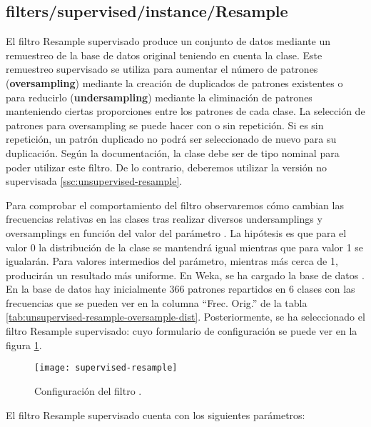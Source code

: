 \subsection{filters/supervised/instance/Resample}
\label{ssc:supervised-resample}
El filtro Resample supervisado produce un conjunto de datos mediante un remuestreo de la base de datos original teniendo en cuenta la clase. Este remuestreo supervisado se utiliza para aumentar el número de patrones (\textbf{oversampling}) mediante la creación de duplicados de patrones existentes o para reducirlo (\textbf{undersampling}) mediante la eliminación de patrones manteniendo ciertas proporciones entre los patrones de cada clase. La selección de patrones para oversampling se puede hacer con o sin repetición. Si es sin repetición, un patrón duplicado no podrá ser seleccionado de nuevo para su duplicación. Según la documentación, la clase debe ser de tipo nominal para poder utilizar este filtro. De lo contrario, deberemos utilizar la versión no supervisada \ref{ssc:unsupervised-resample}.

Para comprobar el comportamiento del filtro observaremos cómo cambian las frecuencias relativas en las clases tras realizar diversos undersamplings y oversamplings en función del valor del parámetro . La hipótesis es que para el valor 0 la distribución de la clase se mantendrá igual mientras que para valor 1 se igualarán. Para valores intermedios del parámetro, mientras más cerca de 1, producirán un resultado más uniforme. En Weka, se ha cargado la base de datos . En la base de datos hay inicialmente 366 patrones repartidos en 6 clases con las frecuencias que se pueden ver en la columna ``Frec. Orig.'' de la tabla \ref{tab:unsupervised-resample-oversample-dist}. Posteriormente, se ha seleccionado el filtro Resample supervisado:  cuyo formulario de configuración se puede ver en la figura \ref{fig:supervised-resample}.

\begin{figure}[ht]
    \centering
    \texttt{[image: supervised-resample]}
    \caption{Configuración del filtro .}
    \label{fig:supervised-resample}
\end{figure}
El filtro Resample supervisado cuenta con los siguientes parámetros:

